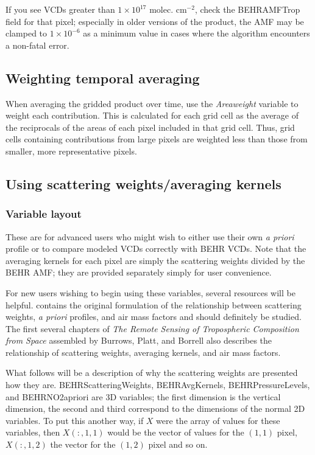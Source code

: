\documentclass[12pt]{article}
\begin{document}
	If you see VCDs greater than $1 \times 10^{17}$ molec. cm$^{-2}$, check the BEHRAMFTrop field for that pixel; especially in older versions of the product, the AMF may be clamped to $1 \times 10^{-6}$ as a minimum value in cases where the algorithm encounters a non-fatal error.
	
	\subsection{Weighting temporal averaging}
	When averaging the gridded product over time, use the \emph{Areaweight} variable to weight each contribution.  This is calculated for each grid cell as the average of the reciprocals of the areas of each pixel included in that grid cell.  Thus, grid cells containing contributions from large pixels are weighted less than those from smaller, more representative pixels.
	
	\subsection{Using scattering weights/averaging kernels} \label{sec:scweights}
	\subsubsection{Variable layout}
	These are for advanced users who might wish to either use their own \emph{a priori}  profile or to compare modeled  VCDs correctly with BEHR VCDs.  Note that the averaging kernels for each pixel are simply the scattering weights divided by the BEHR AMF; they are provided separately simply for user convenience.
	
	For new users wishing to begin using these variables, several resources will be helpful. \citet{palmer2001} contains the original formulation of the relationship between scattering weights, \emph{a priori}  profiles, and air mass factors and should definitely be studied. The first several chapters of \emph{The Remote Sensing of Tropospheric Composition from Space} assembled by Burrows, Platt, and Borrell \citep{burrows-platt} also describes the relationship of scattering weights, averaging kernels, and air mass factors.
	
	What follows will be a description of why the scattering weights are presented how they are.  BEHRScatteringWeights, BEHRAvgKernels, BEHRPressureLevels, and BEHRNO2apriori are 3D variables; the first dimension is the vertical dimension, the second and third correspond to the dimensions of the normal 2D variables. To put this another way, if $X$ were the array of values for these variables, then $X(:,1,1)$ would be the vector of values for the $(1,1)$ pixel, $X(:,1,2)$ the vector for the $(1,2)$ pixel and so on.
	
\end{document}
